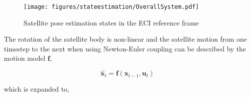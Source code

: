 \begin{figure}[H]
    \centering
    \texttt{[image: figures/stateestimation/OverallSystem.pdf]}
    \caption{Satellite pose estimation states in the ECI reference frame}
    \label{fig:System Modelling}
\end{figure}

\label{sec:statemotionmodel}

The rotation of the satellite body is non-linear and the satellite motion from one timestep to the next when using Newton-Euler coupling can be described by the motion model
$\mathbf{f}$,

\begin{equation}
    \mathbf{\hat{x}}_t = \mathbf{f}(\mathbf{x}_{t-1},\mathbf{u}_t)
\end{equation}

\noindent
which is expanded to,

